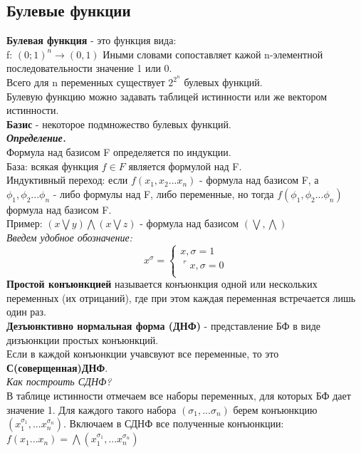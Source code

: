 \documentclass{article}
\begin{document}
\subsection{Булевые функции}
\textbf{Булевая функция} - это функция вида: \\
f: $(0;1)^n \rightarrow (0,1)$
Иными словами сопоставляет кажой n-элементной последовательности значение 1 или 0.\\
Всего для n переменных существует $2^{2^n}$ булевых функций.\\
Булевую функцию можно задавать таблицей истинности или же вектором истинности.\\
\textbf{Базис} - некоторое подмножество булевых функций.\\
\textit{\textbf{Определение.}}\\
Формула над базисом F определяется по индукции.\\
База: всякая функция $f \in F$ является формулой над F.\\
Индуктивный переход: если $f(x_1 , x_2... x_n)$ - формула над базисом F, а $\phi_1 , \phi_2... \phi_n$ - либо формулы 
над F, либо переменные, но тогда $f(\phi_1 , \phi_2... \phi_n)$   формула над базисом F.\\
Пример: $(x\bigvee y)\bigwedge(x\bigvee z)$ - формула над базисом $( \bigvee, \bigwedge )$\\
\textit{Введем удобное обозначение:}\\
\begin{equation*}
x^{\sigma} = 
\begin{cases}
x, \sigma = 1\\
\ulcorner x, \sigma =0\\
\end{cases}
\end{equation*}
\textbf{Простой конъюнкцией} называется конъюнкция одной или нескольких переменных (их отрицаний), где при этом каждая переменная встречается лишь один раз.\\
\textbf{Дезъюнктивно нормальная форма (ДНФ)} - представление БФ в виде дизъюнкции простых конъюнкций.\\
Если в каждой конъюнкции учавсвуют все переменные, то это \textbf{С(соверщенная)ДНФ}.\\
\textit{Как построить СДНФ?}\\
В таблице истинности отмечаем все наборы переменных, для которых БФ дает значение 1. Для каждого такого набора $(\sigma_1, ... \sigma_n)$ берем конъюнкцию $(x^{\sigma_1}_1, ...x^{\sigma_n}_n)$. Включаем в СДНФ все полученные конъюнкции:\\ $f(x_1...x_n) = \bigwedge (x^{\sigma_1}_1, ...x^{\sigma_n}_n)$\\
\end{document}
